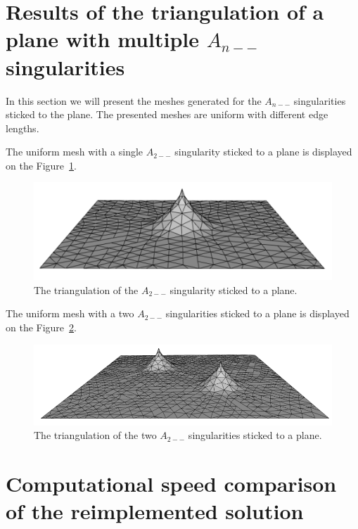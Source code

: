 \clearpage
\section{Results of the triangulation of a plane with multiple $A_{n--}$ singularities}
In this section we will present the meshes generated for the $A_{n--}$ singularities
sticked to the plane. The presented meshes are uniform with different edge lengths.

The uniform mesh with a single $A_{2--}$ singularity sticked to a plane is displayed
on the Figure~\ref{img:84}.

\begin{figure}[h!]
    \centerline{\includegraphics[scale=0.5]{images/img84}}
    \caption[The triangulation of the $A_{2--}$ singularity sticked to a plane]
    {The triangulation of the $A_{2--}$ singularity sticked to a plane.}
    \label{img:84}
\end{figure}

The uniform mesh with a two $A_{2--}$ singularities sticked to a plane is displayed
on the Figure~\ref{img:85}.

\begin{figure}[h!]
    \centerline{\includegraphics[scale=0.5]{images/img85}}
    \caption[The triangulation of the two $A_{2--}$ singularities sticked to a plane]
    {The triangulation of the two $A_{2--}$ singularities sticked to a plane.}
    \label{img:85}
\end{figure}

\section{Computational speed comparison of the reimplemented solution}
\label{sub4.3}